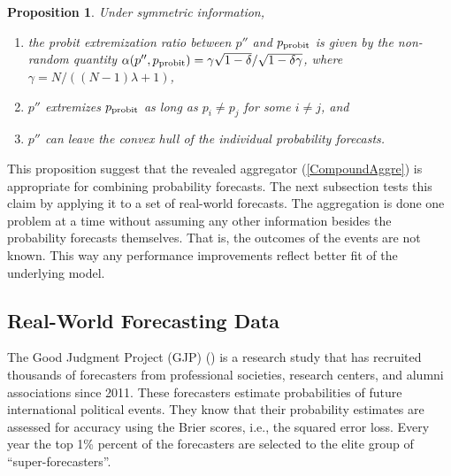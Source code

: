 \documentclass[12pt]{article}
\newtheorem{proposition}[theorem]{Proposition}
\theoremstyle{definition}
\theoremstyle{definition}
\def\probit{p_{\rm probit}}
\begin{document}
\begin{proposition} \label{positiveThm}
Under symmetric information, 
\begin{enumerate}
\item[$(i)$] the probit extremization ratio between $p''$ and $\probit$ is given by the
non-random quantity $\alpha(p'', \probit) =  \gamma \sqrt{1 - \delta}/\sqrt{1-\delta\gamma}$, where $\gamma = N/((N-1)\lambda +1)$,
\item[$(ii)$] $p''$ extremizes $\probit$ as long as $p_i \neq p_j$ for some $i \neq j$,
and
\item[$(iii)$] $p''$ can leave the convex hull
of the individual probability forecasts.
\end{enumerate}
\end{proposition}
This proposition suggest that the revealed aggregator
(\ref{CompoundAggre}) is appropriate for combining probability
forecasts. The next subsection tests this claim by applying it to a set
of real-world forecasts. The aggregation is done one problem at a time
without assuming any other information besides the probability
forecasts themselves. That is, the outcomes of the events are not
known. This way any performance improvements reflect better fit of the
underlying model.



\subsection{Real-World Forecasting Data}
\label{realData}
The Good Judgment Project (GJP) (\citealt{mellers2014psychological,
ungar2012good}) is a research study that has recruited
thousands of forecasters from professional societies, research
centers, and alumni associations since 2011.  These forecasters estimate
probabilities of future international political events.  They know that their
probability estimates are assessed for accuracy using the Brier scores, i.e., the
squared error loss.  
Every year the top 1\% percent of the forecasters are
selected to the elite group of ``super-forecasters''. 
\end{document}
